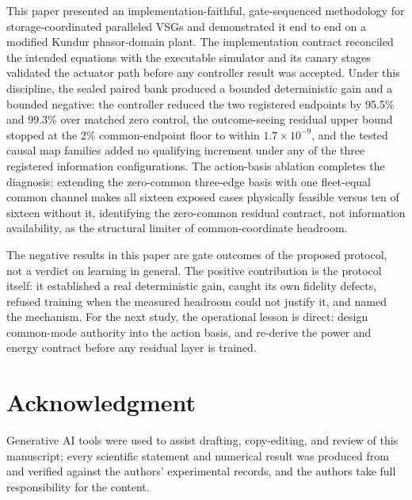\documentclass[journal]{IEEEtran}
\begin{document}
This paper presented an implementation-faithful, gate-sequenced methodology for storage-coordinated paralleled VSGs and demonstrated it end to end on a modified Kundur phasor-domain plant. The implementation contract reconciled the intended equations with the executable simulator and its canary stages validated the actuator path before any controller result was accepted. Under this discipline, the sealed paired bank produced a bounded deterministic gain and a bounded negative: the controller reduced the two registered endpoints by 95.5\% and 99.3\% over matched zero control, the outcome-seeing residual upper bound stopped at the 2\% common-endpoint floor to within $1.7\times10^{-9}$, and the tested causal map families added no qualifying increment under any of the three registered information configurations. The action-basis ablation completes the diagnosis: extending the zero-common three-edge basis with one fleet-equal common channel makes all sixteen exposed cases physically feasible versus ten of sixteen without it, identifying the zero-common residual contract, not information availability, as the structural limiter of common-coordinate headroom.

The negative results in this paper are gate outcomes of the proposed protocol, not a verdict on learning in general. The positive contribution is the protocol itself: it established a real deterministic gain, caught its own fidelity defects, refused training when the measured headroom could not justify it, and named the mechanism. For the next study, the operational lesson is direct: design common-mode authority into the action basis, and re-derive the power and energy contract before any residual layer is trained.

\section*{Acknowledgment}
Generative AI tools were used to assist drafting, copy-editing, and review of this manuscript; every scientific statement and numerical result was produced from and verified against the authors' experimental records, and the authors take full responsibility for the content. %



\end{document}

